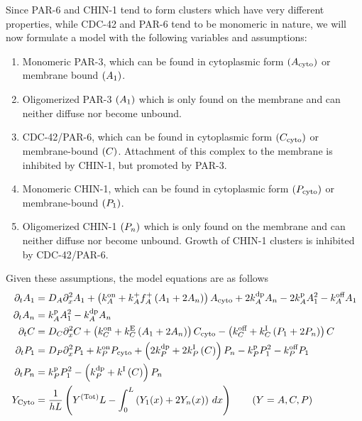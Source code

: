 \documentclass[11pt]{article}
\newcommand{\6}[1]{#1_{\text{6}}}
\newcommand{\3}[1]{#1_{\text{3}}}
\newcommand{\Tot}[1]{#1^\text{(Tot)}}
\newcommand{\A}[1]{#1_A}
\newcommand{\Chin}[1]{#1_P}
\newcommand{\C}[1]{#1_C}
\begin{document}
Since PAR-6 and CHIN-1 tend to form clusters which have very different properties, while CDC-42 and PAR-6 tend to be monomeric in nature, we will now formulate a model with the following variables and assumptions:
\begin{enumerate}
\item Monomeric PAR-3, which can be found in cytoplasmic form $(A_\text{cyto})$ or membrane bound $(A_1)$.
\item Oligomerized PAR-3 $(A_1)$ which is only found on the membrane and can neither diffuse nor become unbound.
\item CDC-42/PAR-6, which can be found in cytoplasmic form $(C_\text{cyto})$ or membrane-bound $(C)$. Attachment of this complex to the membrane is inhibited by CHIN-1, but promoted by PAR-3. 
\item Monomeric CHIN-1, which can be found in cytoplasmic form $(P_\text{cyto})$ or membrane-bound $(P_1)$. 
\item Oligomerized CHIN-1 $(P_n)$ which is only found on the membrane and can neither diffuse nor become unbound. Growth of CHIN-1 clusters is inhibited by CDC-42/PAR-6.
\end{enumerate}
Given these assumptions, the model equations are as follows
\begin{subequations}
\begin{align}
\Dt \MA & = \A{D} \Dx^2 \MA + \left(\A{\kon}+\A{\kf}\A{f}^+\left(\MA+2\PA\right)\right)  \MAC + 2\A{\kdp}\PA -2\A{\kp} \MA^2 - \A{\koff}\MA \\
\Dt \PA & =\A{\kp}\MA^2- \A{\kdp}\PA \\
\Dt \CD &=  \C{D} \Dx^2  \CD + \left(\C{\kon} + \C{\kE} \left(\MA+2\PA\right)\right) \CDCy -  \left(\C{\koff}+\C{\kI} \left(\MChin+2\PChin\right) \right) \CD  \\
\Dt \MChin & =   \Chin{D} \Dx^2  \MChin + \Chin{\kon} \MChinC +\left(2\Chin{\kdp}+2\Chin{\kI} \left(\CD\right)\right)\PChin -\Chin{\kp} \MChin^2  -\Chin{\koff}\MChin\\
\Dt \PChin & =\Chin{\kp} \MChin^2 -\left(\Chin{\kdp}+\kI \left(\CD\right)\right)\PChin \\
Y_\text{Cyto} & = \frac{1}{h L} \left(\Tot{Y} L - \int_0^L \left(Y_1(x)+2Y_n(x)\right) \, dx \right) \qquad \left(Y=A,C,P\right)
\end{align}
\end{subequations}
\end{document}
